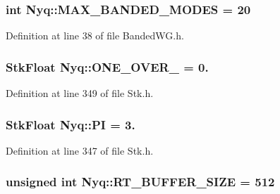 \subsubsection[{\texorpdfstring{M\+A\+X\+\_\+\+B\+A\+N\+D\+E\+D\+\_\+\+M\+O\+D\+ES}{MAX_BANDED_MODES}}]{ {\bf int} Nyq\+::\+M\+A\+X\+\_\+\+B\+A\+N\+D\+E\+D\+\_\+\+M\+O\+D\+ES = 20}\hypertarget{namespace_nyq_a3b6b7f1245b5eed8518a8240035c74cb}{}\label{namespace_nyq_a3b6b7f1245b5eed8518a8240035c74cb}


Definition at line 38 of file Banded\+W\+G.\+h.

\subsubsection[{\texorpdfstring{O\+N\+E\+\_\+\+O\+V\+E\+R\+\_\+128}{ONE_OVER_128}}]{ {\bf Stk\+Float} Nyq\+::\+O\+N\+E\+\_\+\+O\+V\+E\+R\+\_ = 0.}\hypertarget{namespace_nyq_a4404681fcca31b59c925452f3252697b}{}\label{namespace_nyq_a4404681fcca31b59c925452f3252697b}


Definition at line 349 of file Stk.\+h.

\subsubsection[{\texorpdfstring{PI}{PI}}]{ {\bf Stk\+Float} Nyq\+::\+PI = 3.}\hypertarget{namespace_nyq_aaf0ff881e68ea0ef8a4940d4df6fadb9}{}\label{namespace_nyq_aaf0ff881e68ea0ef8a4940d4df6fadb9}


Definition at line 347 of file Stk.\+h.

\subsubsection[{\texorpdfstring{R\+T\+\_\+\+B\+U\+F\+F\+E\+R\+\_\+\+S\+I\+ZE}{RT_BUFFER_SIZE}}]{ unsigned {\bf int} Nyq\+::\+R\+T\+\_\+\+B\+U\+F\+F\+E\+R\+\_\+\+S\+I\+ZE = 512}\hypertarget{namespace_nyq_a0a67b8d33566f4de1860c6b56df627e0}{}\label{namespace_nyq_a0a67b8d33566f4de1860c6b56df627e0}


